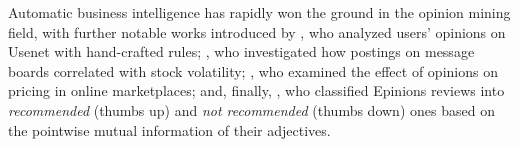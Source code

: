 Automatic business intelligence has rapidly won the ground in the
opinion mining field, with further notable works introduced by
\citet{Glance:05}, who analyzed users' opinions on Usenet with
hand-crafted rules; \citet{Antweiler:04}, who investigated how
postings on message boards correlated with stock volatility;
\citet{Ghose:07}, who examined the effect of opinions on pricing in
online marketplaces; and, finally, \citet{Turney:02}, who classified
Epinions reviews into \emph{recommended} (thumbs up) and \emph{not
  recommended} (thumbs down) ones based on the pointwise mutual
information of their adjectives.




